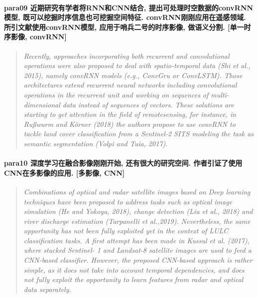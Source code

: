 \paragraph*{para09
    \textcolor[RGB]{17, 205, 29}{近期研究有学者将RNN和CNN结合, 提出可处理时空数据的convRNN模型, 既可以挖掘时序信息也可挖掘空间特征. convRNN刚刚应用在遥感领域. 所引文献使用convRNN模型, 应用于哨兵二号的时序影像, 做语义分割. [单一时序影像, convRNN]}}
\begin{quotation}
    \itshape
    Recently, approaches incorporating both recurrent and convolutional operations were also proposed to deal with spatio-temporal data (Shi et al., 2015), namely convRNN models (e.g., ConvGru or ConvLSTM). Those architectures extend recurrent neural networks including convolutional operations in the recurrent unit and working on sequences of multi-dimensional data instead of sequences of vectors. These solutions are starting to get attention in the field of remotesensing, for instance, in Rußwurm and Körner (2018) the authors propose to use convRNN to tackle land cover classification from a Sentinel-2 SITS modeling the task as semantic segmentation (Volpi and Tuia, 2017).
\end{quotation}

\paragraph*{para10
    \textcolor[RGB]{17, 205, 29}{深度学习在融合影像刚刚开始, 还有很大的研究空间. 作者引证了使用CNN在多影像的应用. [多影像, CNN]}}
\begin{quotation}
    \itshape
    Combinations of optical and radar satellite images based on Deep learning techniques have been proposed to address tasks such as optical image simulation (He and Yokoya, 2018), change detection (Liu et al., 2018) and river discharge estimation (Tarpanelli et al.,2019). Nevertheless, the same opportunity has not been fully exploited yet in the context of LULC classification tasks. A first attempt has been made in Kussul et al. (2017), where stacked Sentinel-
    1 and Landsat-8 satellite images are used to feed a CNN-based classifier. However, the proposed CNN-based approach is rather simple, as it does not take into account temporal dependencies, and does not fully exploit the opportunity to learn features from radar and optical data separately.
\end{quotation}

